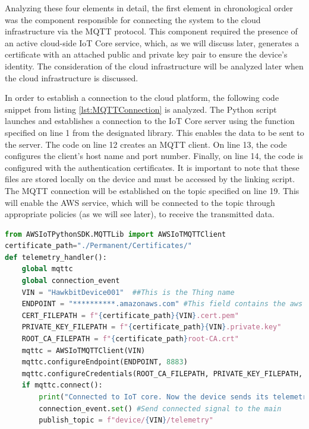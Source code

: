 Analyzing these four elements in detail, the first element in chronological order was the component responsible for connecting the system to the cloud infrastructure via the MQTT protocol. This component required the presence of an active cloud-side IoT Core service, which, as we will discuss later, generates a certificate with an attached public and private key pair to ensure the device's identity. The consideration of the cloud infrastructure will be analyzed later when the cloud infrastructure is discussed.

In order to establish a connection to the cloud platform, the following code snippet from listing \ref{lst:MQTTConnection} is analyzed. The Python script launches and establishes a connection to the IoT Core server using the function specified on line 1 from the designated library. This enables the data to be sent to the server. The code on line 12 creates an MQTT client. On line 13, the code configures the client's host name and port number. Finally, on line 14, the code is configured with the authentication certificates. It is important to note that these files are stored locally on the device and must be accessed by the linking script. The MQTT connection will be established on the topic specified on line 19. This will enable the AWS service, which will be connected to the topic through appropriate policies (as we will see later), to receive the transmitted data.

\begin{lstlisting}[language=Python, caption={MQTT connection to the IoT Core AWS service}, label=lst:MQTTConnection, linerange={1-23}]
from AWSIoTPythonSDK.MQTTLib import AWSIoTMQTTClient
certificate_path="./Permanent/Certificates/"
def telemetry_handler():
    global mqttc
    global connection_event
    VIN = "HawkbitDevice001"  ##This is the Thing name
    ENDPOINT = "**********.amazonaws.com" #This field contains the aws region
    CERT_FILEPATH = f"{certificate_path}{VIN}.cert.pem"
    PRIVATE_KEY_FILEPATH = f"{certificate_path}{VIN}.private.key"
    ROOT_CA_FILEPATH = f"{certificate_path}root-CA.crt"
    mqttc = AWSIoTMQTTClient(VIN)
    mqttc.configureEndpoint(ENDPOINT, 8883)
    mqttc.configureCredentials(ROOT_CA_FILEPATH, PRIVATE_KEY_FILEPATH, CERT_FILEPATH)
    if mqttc.connect():
        print("Connected to IoT core. Now the device sends its telemetry every 1 seconds")
        connection_event.set() #Send connected signal to the main
        publish_topic = f"device/{VIN}/telemetry"
\end{lstlisting}

